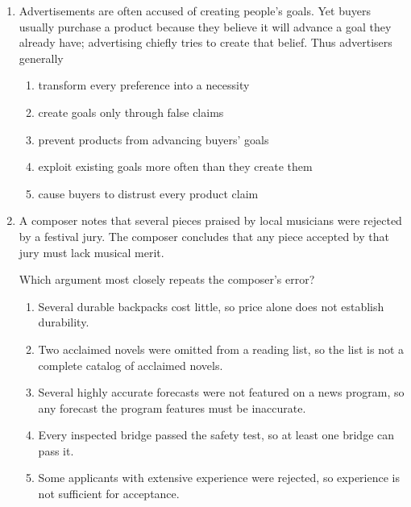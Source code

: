 \begin{enumerate}
Which argument uses the most similar pattern?
\begin{enumerate}
\item Every parcel scanned yesterday reached the sorting room; parcel K was scanned yesterday, so parcel K reached the sorting room.
\item Last season, no bicycle using Sealant Z had a puncture; every bicycle on this season's tour uses Sealant Z, so none will have a puncture this season.
\item No metal sample with coating R corroded in the same laboratory trial; sample M had coating R in that trial, so it did not corrode.
\item All books borrowed on Monday were returned; every book now on the cart was borrowed Monday, so every book on the cart was returned.
\item No nocturnal bird feeds at noon; this bird is nocturnal, so it does not feed at noon.
\end{enumerate}

\item Advertisements are often accused of creating people's goals. Yet buyers usually purchase a product because they believe it will advance a goal they already have; advertising chiefly tries to create that belief. Thus advertisers generally
\begin{enumerate}
\item transform every preference into a necessity
\item create goals only through false claims
\item prevent products from advancing buyers' goals
\item exploit existing goals more often than they create them
\item cause buyers to distrust every product claim
\end{enumerate}

\item A composer notes that several pieces praised by local musicians were rejected by a festival jury. The composer concludes that any piece accepted by that jury must lack musical merit.

Which argument most closely repeats the composer's error?
\begin{enumerate}
\item Several durable backpacks cost little, so price alone does not establish durability.
\item Two acclaimed novels were omitted from a reading list, so the list is not a complete catalog of acclaimed novels.
\item Several highly accurate forecasts were not featured on a news program, so any forecast the program features must be inaccurate.
\item Every inspected bridge passed the safety test, so at least one bridge can pass it.
\item Some applicants with extensive experience were rejected, so experience is not sufficient for acceptance.
\end{enumerate}
\end{enumerate}

